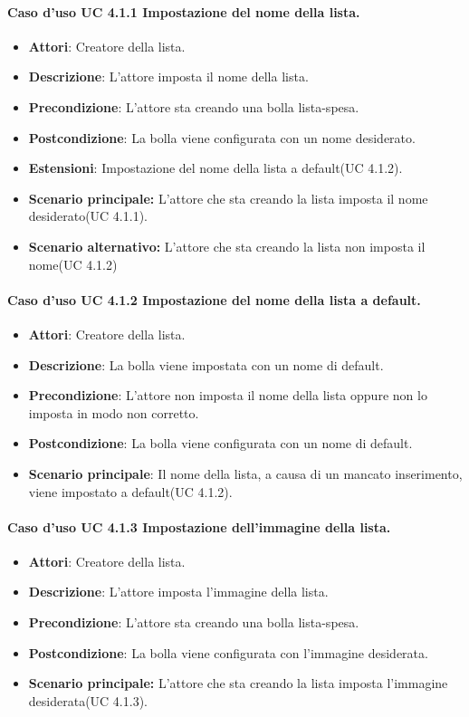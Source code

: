 \paragraph{Caso d'uso UC 4.1.1 Impostazione del nome della lista.}
	\begin{itemize}
	\item\textbf{Attori}: Creatore della lista.
		\item\textbf{Descrizione}: L'attore imposta il nome della lista.
		\item\textbf{Precondizione}: L'attore sta creando una bolla lista-spesa.
		\item\textbf{Postcondizione}: La bolla viene configurata con un nome desiderato.
		\item\textbf{Estensioni}: Impostazione del nome della lista a default(UC 4.1.2).
		\item\textbf{Scenario principale:} L'attore che sta creando la lista imposta il nome desiderato(UC 4.1.1).
		\item\textbf{Scenario alternativo:} L'attore che sta creando la lista non imposta il nome(UC 4.1.2)
		
	\end{itemize}

\paragraph{Caso d'uso UC 4.1.2 Impostazione del nome della lista a default.}
	\begin{itemize}
	\item\textbf{Attori}: Creatore della lista.
		\item\textbf{Descrizione}: La bolla viene impostata con un nome di default.
		\item\textbf{Precondizione}: L'attore non imposta il nome della lista oppure non lo imposta in modo non corretto.
		\item\textbf{Postcondizione}: La bolla viene configurata con un nome di default.
		\item\textbf{Scenario principale}: Il nome della lista, a causa di un mancato inserimento, viene impostato a default(UC 4.1.2).
		
	\end{itemize}
	
	
\paragraph{Caso d'uso UC 4.1.3 Impostazione dell'immagine della lista.}
	\begin{itemize}
	\item\textbf{Attori}: Creatore della lista.
		\item\textbf{Descrizione}: L'attore imposta l'immagine della lista.
		\item\textbf{Precondizione}: L'attore sta creando una bolla lista-spesa.
		\item\textbf{Postcondizione}: La bolla viene configurata con l'immagine desiderata.
		
		\item\textbf{Scenario principale:} L'attore che sta creando la lista imposta l'immagine desiderata(UC 4.1.3).
		
		
	\end{itemize}
	